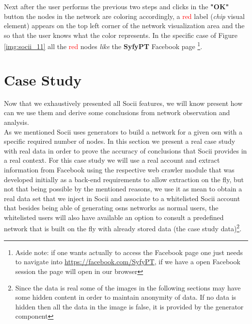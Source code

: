 \indent Next after the user performs the previous two steps and clicks in the \textbf{"OK"} button the nodes in the network are coloring accordingly, a \textcolor{red}{red} label (\textit{chip} visual element) appears on the top left corner of the network visualization area and the so that the user knows what the color represents. In the specific case of Figure \ref{img:socii_11} all the \textcolor{red}{red} nodes \textit{like} the \textbf{SyfyPT} Facebook page \footnote{Aside note: if one wants actually to access the Facebook page one just needs to navigate into \url{https://facebook.com/SyfyPT}, if we have a open Facebook session the page will open in our browser}.


\clearpage

\section{Case Study}
Now that we exhaustively presented all Socii features, we will know present how can we use them and derive some conclusions from network observation and analysis.\\
\indent As we mentioned Socii uses generators to build a network for a given \gls{osn} with a specific required number of nodes. In this section we present a real case study with real data in order to prove the accuracy of conclusions that Socii provides in a real context. For this case study we will use a real account and extract information from Facebook using the respective web crawler module that was developed initially as a back-end requirements to allow extraction on the fly, but not that being possible by the mentioned reasons, we use it as mean to obtain a real data set that we inject in Socii and associate to a whitelisted Socii account that besides being able of generating \glspl{osn} networks as normal users, the whitelisted users will also have available an option to consult a predefined network that is built on the fly with already stored data (the case study data)\footnote{Since the data is real some of the images in the following sections may have some hidden content in order to maintain anonymity of data. If no data is hidden then all the data in the image is false, it is provided by the generator component}.

